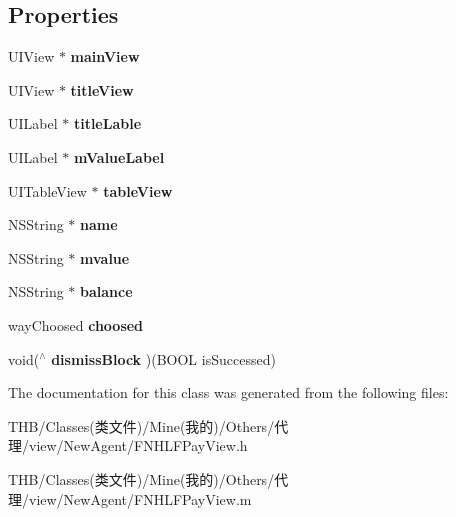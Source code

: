 \subsection*{Properties}
\begin{DoxyCompactItemize}
\item 
\mbox{\label{interface_f_n_h_l_f_pay_view_a8ad127af7dd490af810eabdcced3788f}} 
U\+I\+View $\ast$ {\bfseries main\+View}
\item 
\mbox{\label{interface_f_n_h_l_f_pay_view_acf9cef1d83811df3870cfb65b31488b2}} 
U\+I\+View $\ast$ {\bfseries title\+View}
\item 
\mbox{\label{interface_f_n_h_l_f_pay_view_ad543cfefbf9a1eed3170b8510f69c9e6}} 
U\+I\+Label $\ast$ {\bfseries title\+Lable}
\item 
\mbox{\label{interface_f_n_h_l_f_pay_view_aac0c95732d7c19767363695b0b353af0}} 
U\+I\+Label $\ast$ {\bfseries m\+Value\+Label}
\item 
\mbox{\label{interface_f_n_h_l_f_pay_view_a822c12724f4182f72cc2b0316e336217}} 
U\+I\+Table\+View $\ast$ {\bfseries table\+View}
\item 
\mbox{\label{interface_f_n_h_l_f_pay_view_a5c80a7c2eb887f89579d18670e646039}} 
N\+S\+String $\ast$ {\bfseries name}
\item 
\mbox{\label{interface_f_n_h_l_f_pay_view_a0956990cf4ebe398f1852055ce03e329}} 
N\+S\+String $\ast$ {\bfseries mvalue}
\item 
\mbox{\label{interface_f_n_h_l_f_pay_view_af3056dc1ba52f77a95d16f6364032114}} 
N\+S\+String $\ast$ {\bfseries balance}
\item 
\mbox{\label{interface_f_n_h_l_f_pay_view_ad45a6a06c464483bceba11d742a49030}} 
way\+Choosed {\bfseries choosed}
\item 
\mbox{\label{interface_f_n_h_l_f_pay_view_a121167e534a6ef1468f00411e026b623}} 
void($^\wedge$ {\bfseries dismiss\+Block} )(B\+O\+OL is\+Successed)
\end{DoxyCompactItemize}


The documentation for this class was generated from the following files\+:\begin{DoxyCompactItemize}
\item 
T\+H\+B/\+Classes(类文件)/\+Mine(我的)/\+Others/代理/view/\+New\+Agent/F\+N\+H\+L\+F\+Pay\+View.\+h\item 
T\+H\+B/\+Classes(类文件)/\+Mine(我的)/\+Others/代理/view/\+New\+Agent/F\+N\+H\+L\+F\+Pay\+View.\+m\end{DoxyCompactItemize}
